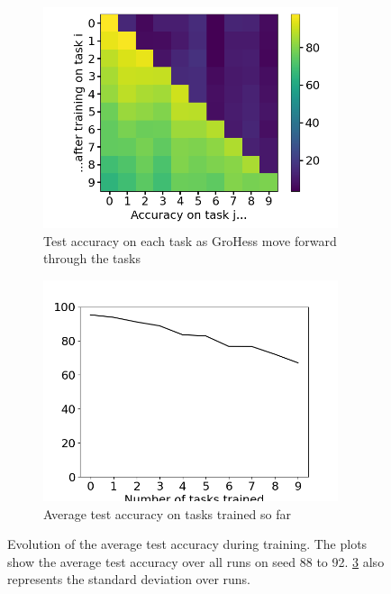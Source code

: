 \documentclass[11pt]{article}
\begin{document}
\begin{figure}
    \centering
    \begin{subfigure}[b]{0.35\textwidth}
        \centering
        \includegraphics[width=0.95\textwidth]{images/accs_matrix.png}
        \caption{Test accuracy on each task as GroHess move forward through the tasks}
        \label{fig:test_accs_matrix}
    \end{subfigure}
    \hspace{-0mm}
    \begin{subfigure}[b]{0.35\textwidth}
        \centering
        \includegraphics[width=0.95\textwidth]{images/avg_acc_curve.png}
        \caption{Average test accuracy on tasks trained so far}
        \label{fig:classic_plot}
    \end{subfigure}
    \caption{Evolution of the average test accuracy during training. The plots show the average test accuracy over all runs on seed 88 to 92. \ref{fig:classic_plot} also represents the standard deviation over runs.}
\end{figure}
\end{document}
